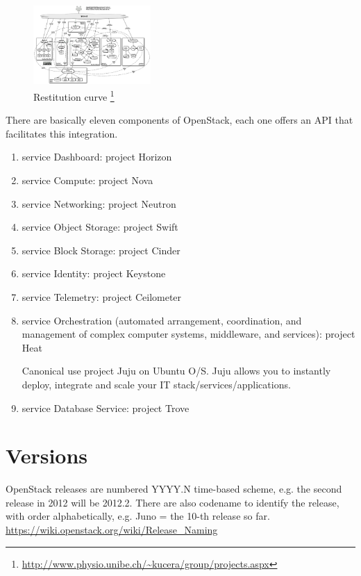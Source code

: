 \begin{figure}[hbt]
  \centerline{\includegraphics[height=3cm,
    angle=0]{./images/OpenStack_structure.eps}}
  \caption{Restitution curve
  \footnote{\url{http://www.physio.unibe.ch/~kucera/group/projects.aspx}}}
  \label{fig:OpenStack_structure}
\end{figure} 


There are basically eleven components of OpenStack, each one offers an API that
facilitates this integration.
\begin{enumerate}
  \item service Dashboard: project Horizon
  \item service Compute: project Nova
  \item service Networking: project Neutron
  \item service Object Storage: project Swift
  \item service Block Storage: project Cinder
  \item service Identity: project Keystone
  \item service Telemetry: project Ceilometer
  \item service Orchestration (automated arrangement, coordination, and
  management of complex computer systems, middleware, and services): project Heat
  
  Canonical use project Juju on Ubuntu O/S. Juju allows you to instantly deploy,
  integrate and scale your IT stack/services/applications.
  
  \item service Database Service: project Trove
\end{enumerate}

\section{Versions}

OpenStack releases are numbered YYYY.N time-based scheme, e.g. the second
release in 2012 will be 2012.2. There are also codename to identify the release,
with order alphabetically, e.g. Juno = the 10-th release so far. 
\url{https://wiki.openstack.org/wiki/Release_Naming}

